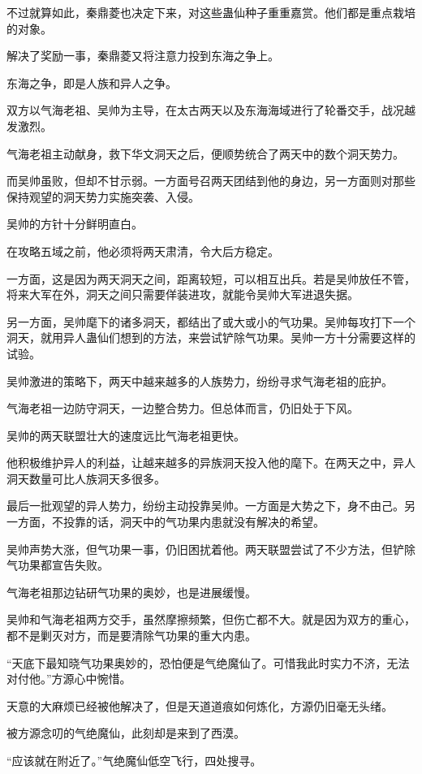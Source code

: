 \begin{this_body}
不过就算如此，秦鼎菱也决定下来，对这些蛊仙种子重重嘉赏。他们都是重点栽培的对象。

解决了奖励一事，秦鼎菱又将注意力投到东海之争上。

东海之争，即是人族和异人之争。

双方以气海老祖、吴帅为主导，在太古两天以及东海海域进行了轮番交手，战况越发激烈。

气海老祖主动献身，救下华文洞天之后，便顺势统合了两天中的数个洞天势力。

而吴帅虽败，但却不甘示弱。一方面号召两天团结到他的身边，另一方面则对那些保持观望的洞天势力实施突袭、入侵。

吴帅的方针十分鲜明直白。

在攻略五域之前，他必须将两天肃清，令大后方稳定。

一方面，这是因为两天洞天之间，距离较短，可以相互出兵。若是吴帅放任不管，将来大军在外，洞天之间只需要佯装进攻，就能令吴帅大军进退失据。

另一方面，吴帅麾下的诸多洞天，都结出了或大或小的气功果。吴帅每攻打下一个洞天，就用异人蛊仙们想到的方法，来尝试铲除气功果。吴帅一方十分需要这样的试验。

吴帅激进的策略下，两天中越来越多的人族势力，纷纷寻求气海老祖的庇护。

气海老祖一边防守洞天，一边整合势力。但总体而言，仍旧处于下风。

吴帅的两天联盟壮大的速度远比气海老祖更快。

他积极维护异人的利益，让越来越多的异族洞天投入他的麾下。在两天之中，异人洞天数量可比人族洞天多很多。

最后一批观望的异人势力，纷纷主动投靠吴帅。一方面是大势之下，身不由己。另一方面，不投靠的话，洞天中的气功果内患就没有解决的希望。

吴帅声势大涨，但气功果一事，仍旧困扰着他。两天联盟尝试了不少方法，但铲除气功果都宣告失败。

气海老祖那边钻研气功果的奥妙，也是进展缓慢。

吴帅和气海老祖两方交手，虽然摩擦频繁，但伤亡都不大。就是因为双方的重心，都不是剿灭对方，而是要清除气功果的重大内患。

“天底下最知晓气功果奥妙的，恐怕便是气绝魔仙了。可惜我此时实力不济，无法对付他。”方源心中惋惜。

天意的大麻烦已经被他解决了，但是天道道痕如何炼化，方源仍旧毫无头绪。

被方源念叨的气绝魔仙，此刻却是来到了西漠。

“应该就在附近了。”气绝魔仙低空飞行，四处搜寻。


\end{this_body}
